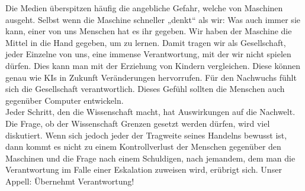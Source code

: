 Die Medien überspitzen häufig die angebliche Gefahr, welche von Maschinen ausgeht. Selbst wenn die Maschine schneller „denkt“ als wir: Was auch immer sie kann, einer von uns Menschen hat es ihr gegeben. Wir haben der Maschine die Mittel in die Hand gegeben, um zu lernen. Damit tragen wir als Gesellschaft, jeder Einzelne von uns, eine immense Verantwortung, mit der wir nicht spielen dürfen. Dies kann man mit der Erziehung von Kindern vergleichen. Diese können genau wie KIs in Zukunft Veränderungen hervorrufen. Für den Nachwuchs fühlt sich die Gesellschaft verantwortlich. Dieses Gefühl  sollten die Menschen auch gegenüber Computer entwickeln. \\
%

Jeder Schritt, den die Wissenschaft macht, hat Auswirkungen auf die Nachwelt. Die Frage, ob der Wissenschaft Grenzen gesetzt werden dürfen, wird viel diskutiert. Wenn sich jedoch jeder der Tragweite seines Handelns bewusst ist, dann kommt es nicht zu einem Kontrollverlust der Menschen gegenüber den Maschinen und die Frage nach einem Schuldigen, nach jemandem, dem man die Verantwortung im Falle einer Eskalation zuweisen wird, erübrigt sich. Unser Appell: Übernehmt Verantwortung!




